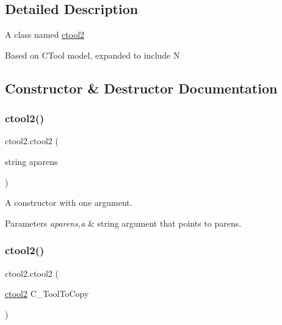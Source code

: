 \subsection{Detailed Description}
A class named \mbox{\hyperlink{classctool2}{ctool2}}

Based on C\+Tool model, expanded to include N 

\subsection{Constructor \& Destructor Documentation}
\mbox{\label{classctool2_ab334aea1ee225ec86031984a2cf87577}} 
\subsubsection{\texorpdfstring{ctool2()}{ctool2()}\hspace{0.1cm}{\footnotesize\ttfamily [1/2]}}
{\footnotesize\ttfamily ctool2.\+ctool2 (\begin{DoxyParamCaption}\item[{string}]{aparens }\end{DoxyParamCaption})\hspace{0.3cm}{\ttfamily [inline]}}



A constructor with one argument. 


\begin{DoxyParams}{Parameters}
{\em aparens,a} & string argument that points to parens. \\
\hline
\end{DoxyParams}
\mbox{\label{classctool2_aa42611f6b7b54168648f5b7896157e51}} 
\subsubsection{\texorpdfstring{ctool2()}{ctool2()}\hspace{0.1cm}{\footnotesize\ttfamily [2/2]}}
{\footnotesize\ttfamily ctool2.\+ctool2 (\begin{DoxyParamCaption}\item[{\mbox{\hyperlink{classctool2}{ctool2}}}]{C\+\_\+\+Tool\+To\+Copy }\end{DoxyParamCaption})\hspace{0.3cm}{\ttfamily [inline]}}



